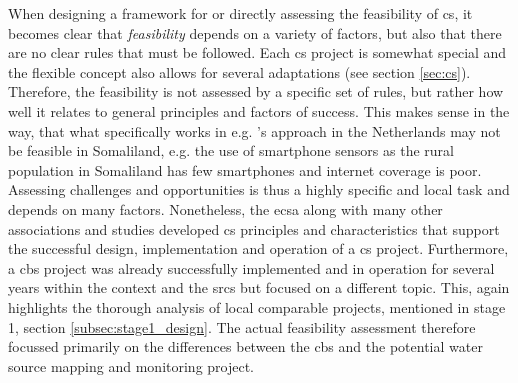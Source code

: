 When designing a framework for or directly assessing the feasibility of \acrshort{cs}, it becomes clear that \textit{feasibility} depends on a variety of factors, but also that there are no clear rules that must be followed. Each \acrshort{cs} project is somewhat special and the flexible concept also allows for several adaptations (see section \ref{sec:cs}). Therefore, the feasibility is not assessed by a specific set of rules, but rather how well it relates to general principles and factors of success. This makes sense in the way, that what specifically works in e.g. \autocite{minkmanCitizenScienceWater2015}'s approach in the Netherlands may not be feasible in Somaliland, e.g. the use of smartphone sensors as the rural population in Somaliland has few smartphones and internet coverage is poor. Assessing challenges and opportunities is thus a highly specific and local task and depends on many factors.\newline
Nonetheless, the \acrshort{ecsa} along with many other associations and studies developed \acrshort{cs} principles and characteristics that support the successful design, implementation and operation of a \acrshort{cs} project. Furthermore, a \acrshort{cbs} project was already successfully implemented and in operation for several years within the context and the \acrshort{srcs} but focused on a different topic. This, again highlights the thorough analysis of local comparable projects, mentioned in stage 1, section \ref{subsec:stage1_design}. The actual feasibility assessment therefore focussed primarily on the differences between the \acrshort{cbs} and the potential water source mapping and monitoring project.\newline



